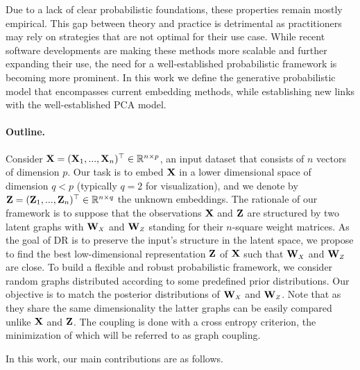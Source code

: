 Due to a lack of clear probabilistic foundations, these properties remain mostly empirical. This gap between theory and practice is detrimental as practitioners may rely on strategies that are not optimal for their use case.
While recent software developments are making these methods more scalable \cite{chan2018t,pezzotti2019gpgpu,linderman2019fast} and further expanding their use, the need for a well-established probabilistic framework is becoming more prominent.
In this work we define the generative probabilistic model that encompasses current embedding methods, while establishing new links with the well-established PCA model.

\paragraph{Outline.} 
Consider $\mathbf{X} = (\mathbf{X}_1,..., \mathbf{X}_n)^\top \in \mathbb{R}^{n \times p}$, an input dataset that consists of $n$ vectors of dimension $p$. Our task is to embed $\mathbf{X}$ in a lower dimensional space of dimension $q<p$ (typically $q=2$ for visualization), and we denote by $\mathbf{Z} = (\mathbf{Z}_1, ..., \mathbf{Z}_n)^\top \in \mathbb{R}^{n \times q}$ the unknown embeddings. The rationale of our framework is to suppose that the observations $\mathbf{X}$ and $\mathbf{Z}$ are structured by two latent graphs with $\Wb_{\scaleto{X}{4pt}}$ and $\Wb_{\scaleto{Z}{4pt}}$ standing for their $n$-square weight matrices.
As the goal of DR is to preserve the input's structure in the latent space, we propose to find the best low-dimensional representation $\mathbf{Z}$ of $\mathbf{X}$ such that $\Wb_{\scaleto{X}{4pt}}$ and $\Wb_{\scaleto{Z}{4pt}}$ are close. To build a flexible and robust probabilistic framework, we consider random graphs distributed according to some predefined prior distributions. Our objective is to match the posterior distributions of $\Wb_{\scaleto{X}{4pt}}$ and $\Wb_{\scaleto{Z}{4pt}}$. Note that as they share the same dimensionality the latter graphs can be easily compared unlike $\mathbf{X}$ and $\mathbf{Z}$. The coupling is done with a cross entropy criterion, the minimization of which will be referred to as graph coupling.

In this work, our main contributions are as follows.

